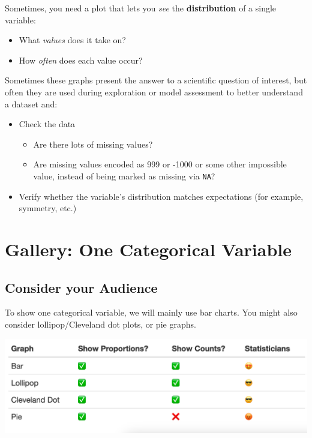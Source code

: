 \documentclass[
  letterpaper,
  DIV=11,
  numbers=noendperiod]{scrreprt}
\providecommand{\tightlist}{%
  \setlength{\itemsep}{0pt}\setlength{\parskip}{0pt}}\usepackage{longtable,booktabs,array}
\theoremstyle{remark}
\begin{document}
Sometimes, you need a plot that lets you \emph{see} the
\textbf{distribution} of a single variable:

\begin{itemize}
\tightlist
\item
  What \emph{values} does it take on?
\item
  How \emph{often} does each value occur?
\end{itemize}

Sometimes these graphs present the answer to a scientific question of
interest, but often they are used during exploration or model assessment
to better understand a dataset and:

\begin{itemize}
\tightlist
\item
  Check the data

  \begin{itemize}
  \tightlist
  \item
    Are there lots of missing values?
  \item
    Are missing values encoded as 999 or -1000 or some other impossible
    value, instead of being marked as missing via \texttt{NA}?
  \end{itemize}
\item
  Verify whether the variable's distribution matches expectations (for
  example, symmetry, etc.)
\end{itemize}

\chapter{Gallery: One Categorical
Variable}\label{gallery-one-categorical-variable}

\section{Consider your Audience}\label{consider-your-audience}

To show one categorical variable, we will mainly use bar charts. You
might also consider lollipop/Cleveland dot plots, or pie graphs.

\begin{center}
\includegraphics[width=0.8\linewidth,height=\textheight,keepaspectratio]{images/one-cat-emojis.png}
\end{center}
\end{document}
